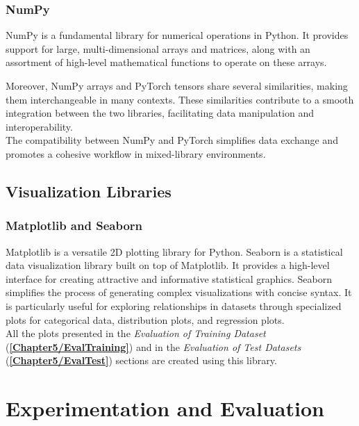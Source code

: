\subsubsection{NumPy}
NumPy is a fundamental library for numerical operations in Python. It provides support for large, multi-dimensional arrays and matrices, along with an assortment of high-level mathematical functions to operate on these arrays.

Moreover, NumPy arrays and PyTorch tensors share several similarities, making them interchangeable in many contexts. These similarities contribute to a smooth integration between the two libraries, facilitating data manipulation and interoperability.\\
The compatibility between NumPy and PyTorch simplifies data exchange and promotes a cohesive workflow in mixed-library environments.

\subsection{Visualization Libraries}
\subsubsection{Matplotlib and Seaborn}
Matplotlib is a versatile 2D plotting library for Python. Seaborn is a statistical data visualization library built on top of Matplotlib. It provides a high-level interface for creating attractive and informative statistical graphics. Seaborn simplifies the process of generating complex visualizations with concise syntax. It is particularly useful for exploring relationships in datasets through specialized plots for categorical data, distribution plots, and regression plots.\\
All the plots presented in the \textit{Evaluation of Training Dataset} (\textbf{\ref{Chapter5/EvalTraining}}) and in the \textit{Evaluation of Test Datasets} (\textbf{\ref{Chapter5/EvalTest}}) sections are created using this library.

\section{Experimentation and Evaluation}
